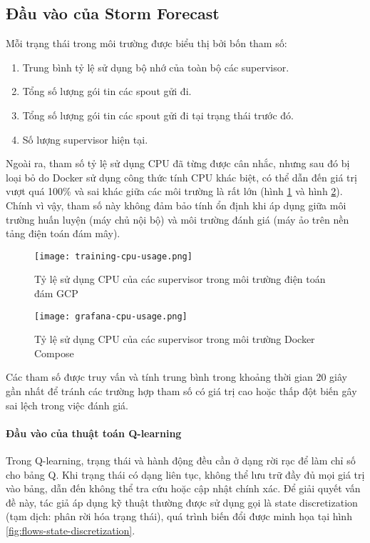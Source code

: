 \subsection{Đầu vào của Storm Forecast}

Mỗi trạng thái trong môi trường được biểu thị bởi bốn tham số:

\begin{enumerate}
    \item Trung bình tỷ lệ sử dụng bộ nhớ của toàn bộ các supervisor.
    \item Tổng số lượng gói tin các spout gửi đi.
    \item Tổng số lượng gói tin các spout gửi đi tại trạng thái trước đó.
    \item Số lượng supervisor hiện tại.
\end{enumerate}

Ngoài ra, tham số tỷ lệ sử dụng CPU đã từng được cân nhắc, nhưng sau đó bị loại bỏ do Docker sử dụng công thức tính CPU khác biệt, có thể dẫn đến giá trị vượt quá 100\% và sai khác giữa các môi trường là rất lớn (hình \ref{fig:gcp-cpu-usage} và hình \ref{fig:compose-cpu-usage}). Chính vì vậy, tham số này không đảm bảo tính ổn định khi áp dụng giữa môi trường huấn luyện (máy chủ nội bộ) và môi trường đánh giá (máy ảo trên nền tảng điện toán đám mây).

\begin{figure}
    \centering
    \texttt{[image: training-cpu-usage.png]}
    \caption{Tỷ lệ sử dụng CPU của các supervisor trong môi trường điện toán đám GCP}
    \label{fig:gcp-cpu-usage}
\end{figure}

\begin{figure}
    \centering
    \texttt{[image: grafana-cpu-usage.png]}
    \caption{Tỷ lệ sử dụng CPU của các supervisor trong môi trường Docker Compose}
    \label{fig:compose-cpu-usage}
\end{figure}

Các tham số được truy vấn và tính trung bình trong khoảng thời gian 20 giây gần nhất để tránh các trường hợp tham số có giá trị cao hoặc thấp đột biến gây sai lệch trong việc đánh giá.

\paragraph{Đầu vào của thuật toán Q-learning}
Trong Q-learning, trạng thái và hành động đều cần ở dạng rời rạc để làm chỉ số cho bảng Q. Khi trạng thái có dạng liên tục, không thể lưu trữ đầy đủ mọi giá trị vào bảng, dẫn đến không thể tra cứu hoặc cập nhật chính xác. Để giải quyết vấn đề này, tác giả áp dụng kỹ thuật thường được sử dụng gọi là state discretization (tạm dịch: phân rời hóa trạng thái), quá trình biến đổi được minh họa tại hình \ref{fig:flows-state-discretization}.

